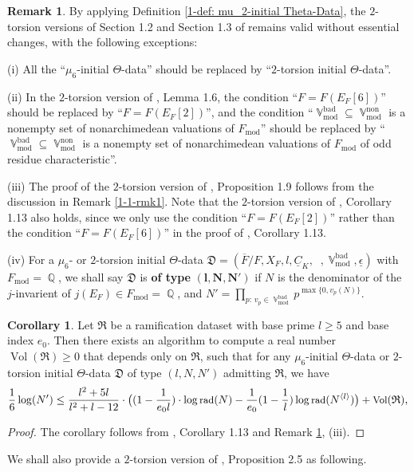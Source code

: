 \documentclass[a4paper, 12pt]{article}
\DeclareMathOperator{\uV}{\underline{\V}}
\DeclareMathOperator{\Q}{\mathbb{Q}}
\DeclareMathOperator{\V}{\mathbb{V}}
\DeclareMathOperator{\rad}{\text{rad}}
\DeclareMathOperator{\bad}{\text{bad}}
\DeclareMathOperator{\non}{\text{non}}
\DeclareMathOperator{\Vol}{\text{Vol}}
\DeclareMathOperator{\tmod}{\text{mod}}
\newcommand{\lagl}{\langle l \rangle}
\numberwithin{equation}{section}
\theoremstyle{definition}
\newtheorem{cor}[thm]{Corollary}
\newtheorem{tiny-remark}{Remark}[thm]
\begin{document}
\begin{tiny-remark} \label{1-1-rmk2}
By applying Definition \ref{1-def: mu_2-initial Theta-Data},
the $2$-torsion versions of Section 1.2 and Section 1.3 of \cite{Diophantine_after_IUT_I} remains valid without essential changes, with the following exceptions:

(i) All the ``$\mu_6$-initial $\Theta$-data'' should be replaced by ``$2$-torsion initial $\Theta$-data''.

(ii) In the $2$-torsion version of \cite{Diophantine_after_IUT_I}, Lemma 1.6, the condition ``$F=F(E_F[6])$'' should be replaced by ``$F=F(E_F[2])$'', 
and the condition ``$\V_{\tmod}^{\bad} \subseteq \V_{\tmod}^{\non}$ is a nonempty set of nonarchimedean valuations of $F_{\tmod}$'' should be replaced by ``$\V_{\tmod}^{\bad} \subseteq \V_{\tmod}^{\non}$ is a nonempty set of nonarchimedean valuations of $F_{\tmod}$ of odd residue
characteristic''.

(iii) The proof of the $2$-torsion version of \cite{Diophantine_after_IUT_I}, Proposition 1.9 follows from the discussion in Remark \ref{1-1-rmk1}.
Note that the $2$-torsion version of \cite{Diophantine_after_IUT_I}, Corollary 1.13 also holds, since we only use the condition ``$F=F(E_F[2])$'' rather than the condition ``$F=F(E_F[6])$'' in the proof of \cite{Diophantine_after_IUT_I}, Corollary 1.13. 

(iv) For a $\mu_6$- or $2$-torsion initial $\Theta$-data $\mathfrak D  =(\overline{F}/F,X_F,l,\underline{C}_K, \uV,\V_{\tmod}^{\bad}, \underline{\epsilon})$ with $F_{\tmod} = \Q$, 
we shall say $\mathfrak D$ is \textbf{of type} $\bm{(l, N, N')}$ if $N$ is the denominator of the $j$-invarient of $j(E_F) \in F_{\tmod} = \Q$, and $N' = \prod_{p:\, v_p \in \V_{\tmod}^{\bad}} p^{\max\{0, v_p(N) \} }$.

\begin{cor} \label{1-cor: The log-volume of ramification dataset}
Let $\mathfrak{R}$ be a ramification dataset with base prime $l\ge 5$ and base index $e_0$. Then there exists an algorithm to compute a real number $\Vol(\mathfrak{R}) \ge 0$ that depends only on $\mathfrak{R}$, 
such that for any $\mu_6$-initial $\Theta$-data or $2$-torsion initial $\Theta$-data $\mathfrak{D}$ of type $(l,N,N')$ admitting $\mathfrak{R}$, we have
\begin{equation*}\small
\frac{1}{6}\log(N') \le  \frac{l^2+5l}{l^2+l-12}\cdot \big( (1-\frac{1}{e_0  l})\cdot \log\rad(N) - \frac{1}{e_0}(1- \frac{1}{l}) \log\rad(N^{\lagl})  \big) + \Vol(\mathfrak{R}),
\end{equation*}

\end{cor}
\begin{proof}
The corollary follows from \cite{Diophantine_after_IUT_I}, Corollary 1.13 and Remark \ref{1-1-rmk2}, (iii).
\end{proof}

We shall also provide a $2$-torsion version of \cite{Diophantine_after_IUT_I}, Proposition 2.5 as following.
\end{tiny-remark}
\end{document}
